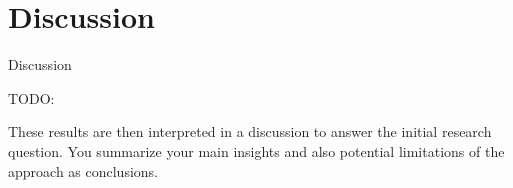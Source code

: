 \chapter{Discussion}
\label{cha:Discussion}
Discussion



TODO:

These results are then interpreted in a discussion to
answer the initial research question. You summarize your
main insights and also potential limitations of the approach
as conclusions.